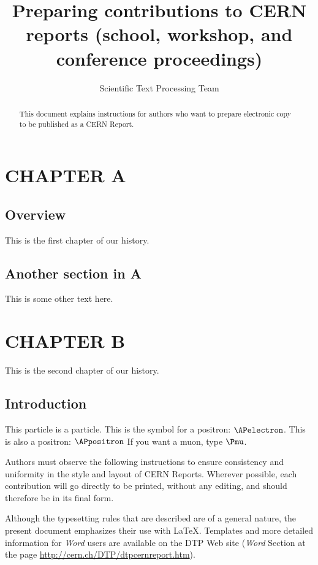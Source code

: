 \documentclass[12pt,twoside,a4paper]{cernrep}
\begin{document}
\title{Preparing contributions to CERN reports (school, workshop, and
conference proceedings)}
 
\author{Scientific Text Processing Team}


\maketitle %


\begin{abstract}
This document explains instructions for authors who want to prepare
electronic copy to be published as a CERN Report.
\end{abstract}

\tableofcontents

\chapter{CHAPTER A}
\section{Overview}
This is the first chapter  of our history.

\section{Another section in A}
This is some other text here.

\chapter{CHAPTER B}
This is the second chapter of our history.

\section{Introduction}

This particle is a \PBpm particle.
This is the symbol for a positron: $\APelectron$.
This is also a positron: $\APpositron$
If you want a muon, type $\Pmu$.

Authors must observe the following instructions to ensure consistency
and uniformity in the style and layout of CERN Reports.  Wherever
possible, each contribution will go directly to be printed, without
any editing, and should therefore be in its final form.

Although the typesetting rules that are described are of a general
nature, the present document emphasizes their use with
\LaTeX. Templates and more detailed information for \emph{Word} users
are available on the DTP Web site (\emph{Word} Section at the page
\url{http://cern.ch/DTP/dtpcernreport.htm}).
 
\end{document}
